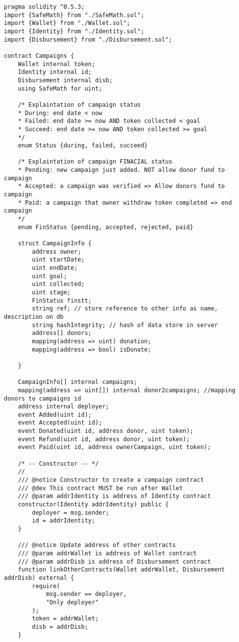 \documentclass[../main-report.tex]{subfiles}
\begin{document}
\begin{lstlisting}
pragma solidity ^0.5.3;
import {SafeMath} from "./SafeMath.sol";
import {Wallet} from "./Wallet.sol";
import {Identity} from "./Identity.sol";
import {Disbursement} from "./Disbursement.sol";

contract Campaigns {
    Wallet internal token;
    Identity internal id;
    Disbursement internal disb;
    using SafeMath for uint;

    /* Explaintation of campaign status
    * During: end date < now
    * Failed: end date >= now AND token collected < goal
    * Succeed: end date >= now AND token collected >= goal
    */
    enum Status {during, failed, succeed}

    /* Explaintation of campaign FINACIAL status
    * Pending: new campaign just added. NOT allow donor fund to campaign
    * Accepted: a campaign was verified => Allow donors fund to campaign
    * Paid: a campaign that owner withdraw token completed => end campaign
    */
    enum FinStatus {pending, accepted, rejected, paid}

    struct CampaignInfo {
        address owner;
        uint startDate;
        uint endDate;
        uint goal;
        uint collected;
        uint stage;
        FinStatus finstt;
        string ref; // store reference to other info as name, description on db
        string hashIntegrity; // hash of data store in server
        address[] donors;
        mapping(address => uint) donation;
        mapping(address => bool) isDonate;
        
    }

    CampaignInfo[] internal campaigns;
    mapping(address => uint[]) internal donor2campaigns; //mapping donors to campaigns id
    address internal deployer;
    event Added(uint id);
    event Accepted(uint id);
    event Donated(uint id, address donor, uint token);
    event Refund(uint id, address donor, uint token);
    event Paid(uint id, address ownerCampaign, uint token);

    /* -- Constructor -- */
    //
    /// @notice Constructor to create a campaign contract
    /// @dev This contract MUST be run after Wallet
    /// @param addrIdentity is address of Identity contract
    constructor(Identity addrIdentity) public {
        deployer = msg.sender;
        id = addrIdentity;
    }

    /// @notice Update address of other contracts
    /// @param addrWallet is address of Wallet contract
    /// @param addrDisb is address of Disbursement contract
    function linkOtherContracts(Wallet addrWallet, Disbursement addrDisb) external {
        require(
            msg.sender == deployer,
            "Only deployer"
        );
        token = addrWallet;
        disb = addrDisb;
    }


\end{lstlisting}
\end{document}
